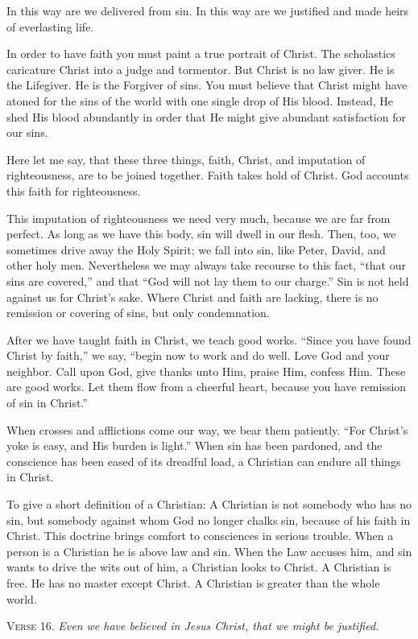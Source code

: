 In this way are we delivered from sin. In this way are we justified and made heirs of everlasting life.

In order to have faith you must paint a true portrait of Christ. The scholastics caricature Christ into a judge and tormentor. But Christ is no law giver. He is the Lifegiver. He is the Forgiver of sins. You must believe that Christ might have atoned for the sins of the world with one single drop of His blood. Instead, He shed His blood abundantly in order that He might give abundant satisfaction for our sins.

Here let me say, that these three things, faith, Christ, and imputation of righteousness, are to be joined together. Faith takes hold of Christ. God accounts this faith for righteousness.

This imputation of righteousness we need very much, because we are far from perfect. As long as we have this body, sin will dwell in our flesh. Then, too, we sometimes drive away the Holy Spirit; we fall into sin, like Peter, David, and other holy men. Nevertheless we may always take recourse to this fact, “that our sins are covered,” and that “God will not lay them to our charge.” Sin is not held against us for Christ’s sake. Where Christ and faith are lacking, there is no remission or covering of sins, but only condemnation.

After we have taught faith in Christ, we teach good works. “Since you have found Christ by faith,” we say, “begin now to work and do well. Love God and your neighbor. Call upon God, give thanks unto Him, praise Him, confess Him. These are good works. Let them flow from a cheerful heart, because you have remission of sin in Christ.”

When crosses and afflictions come our way, we bear them patiently. “For Christ’s yoke is easy, and His burden is light.” When sin has been pardoned, and the conscience has been eased of its dreadful load, a Christian can endure all things in Christ.

To give a short definition of a Christian: A Christian is not somebody who has no sin, but somebody against whom God no longer chalks sin, because of his faith in Christ. This doctrine brings comfort to consciences in serious trouble. When a person is a Christian he is above law and sin. When the Law accuses him, and sin wants to drive the wits out of him, a Christian looks to Christ. A Christian is free. He has no master except Christ. A Christian is greater than the whole world.

\textsc{Verse} 16. \emph{Even we have believed in Jesus Christ, that we might be justified.}

